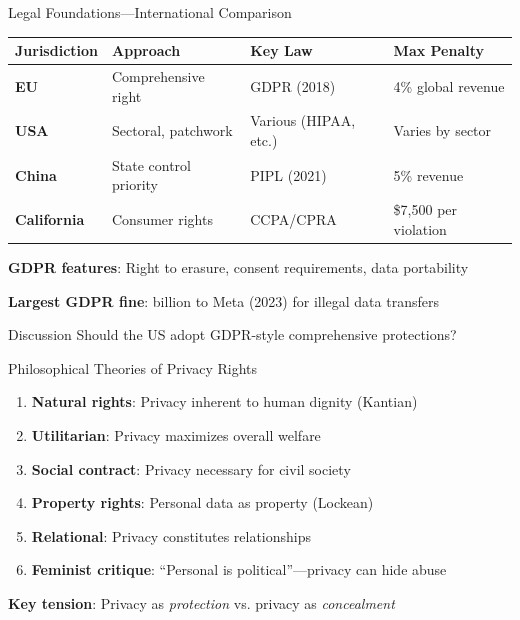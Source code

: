 ﻿\documentclass[aspectratio=169,11pt]{beamer}
\begin{document}
\begin{frame}{Legal Foundations---International Comparison}
\begin{table}[h]
\centering
\scriptsize
\begin{tabular}{@{}llll@{}}
\toprule
\textbf{Jurisdiction} & \textbf{Approach} & \textbf{Key Law} & \textbf{Max Penalty} \\
\midrule
\textbf{EU} & Comprehensive right & GDPR (2018) & 4\% global revenue \\
\textbf{USA} & Sectoral, patchwork & Various (HIPAA, etc.) & Varies by sector \\
\textbf{China} & State control priority & PIPL (2021) & 5\% revenue \\
\textbf{California} & Consumer rights & CCPA/CPRA & \$7,500 per violation \\
\bottomrule
\end{tabular}
\end{table}

\vspace{0.2em}
\textbf{GDPR features}: Right to erasure, consent requirements, data portability

\textbf{Largest GDPR fine}:  billion to Meta (2023) for illegal data transfers

\begin{alertblock}{Discussion}
Should the US adopt GDPR-style comprehensive protections?
\end{alertblock}
\end{frame}

\begin{frame}{Philosophical Theories of Privacy Rights}
\begin{conceptbox}
\small
\begin{enumerate}
    \item \textbf{Natural rights}: Privacy inherent to human dignity (Kantian)
    \item \textbf{Utilitarian}: Privacy maximizes overall welfare
    \item \textbf{Social contract}: Privacy necessary for civil society
    \item \textbf{Property rights}: Personal data as property (Lockean)
    \item \textbf{Relational}: Privacy constitutes relationships \parencite{rachels_privacy,nissenbaum_privacy_context}
    \item \textbf{Feminist critique}: ``Personal is political''---privacy can hide abuse
\end{enumerate}
\end{conceptbox}

\vspace{0.2em}
\textbf{Key tension}: Privacy as \emph{protection} vs. privacy as \emph{concealment}
\end{frame}
\end{document}
